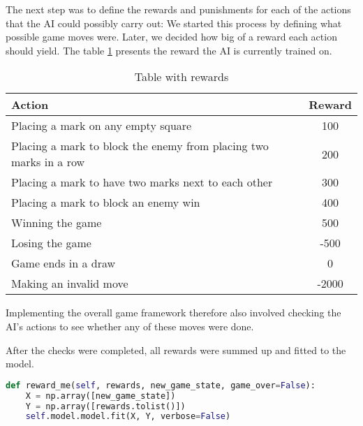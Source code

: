 The next step was to define the rewards and punishments for each of the actions that the \ac{AI} could possibly carry out: We started this process by defining what possible game moves were. Later, we decided how big of a reward each action should yield. The table \ref{tablRewards} presents the reward the \ac{AI} is currently trained on.

\begin{table}[H]
	\begin{tabular}{|l|c|}\hline
		Action & Reward \\ \hline \hline
		Placing a mark on any empty square & 100 \\ \hline
		Placing a mark to block the enemy from placing two marks in a row & 200 \\ \hline
		Placing a mark to have two marks next to each other & 300 \\ \hline
		Placing a mark to block an enemy win & 400 \\ \hline
		Winning the game & 500 \\ \hline
		Losing the game & -500 \\ \hline
		Game ends in a draw & 0 \\ \hline
		Making an invalid move & -2000 \\ \hline
	\end{tabular}
	\caption{Table with rewards}
	\label{tablRewards}
\end{table}
Implementing the overall game framework therefore also involved checking the \ac{AI}'s actions to see whether any of these moves were done.

After the checks were completed, all rewards were summed up and fitted to the model.
\begin{lstlisting}[frame=single,language=Python,caption={Method of processing the reward},captionpos=b]
def reward_me(self, rewards, new_game_state, game_over=False):
    X = np.array([new_game_state])
    Y = np.array([rewards.tolist()])
    self.model.model.fit(X, Y, verbose=False)
\end{lstlisting}

